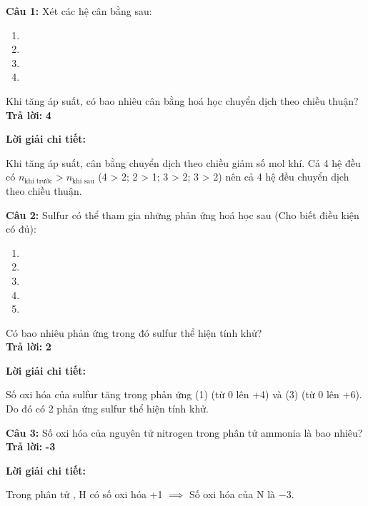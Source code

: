 \documentclass[10.5pt,a4paper]{article}
\newcommand{\loigiai}[1]{%
  \vspace{1pt}
  \begin{tcolorbox}
  {\color{myBlue}\bfseries Lời giải chi tiết:}\par\vspace{1pt}
  {\small #1}
  \end{tcolorbox}
  \vspace{2pt}
}
\begin{document}
\vspace{2pt}
\textbf{Câu 1:} Xét các hệ cân bằng sau:
\begin{enumerate}[label=(\arabic*), itemsep=1pt, topsep=1pt, leftmargin=1.2cm]
    \item {}
    \item {}
    \item {}
    \item {}
\end{enumerate}
Khi tăng áp suất, có bao nhiêu cân bằng hoá học chuyển dịch theo chiều thuận?\\
\textbf{Trả lời:} {\color{myRed}\textbf{4}}
\loigiai{Khi tăng áp suất, cân bằng chuyển dịch theo chiều giảm số mol khí. Cả 4 hệ đều có $n_{\text{khí trước}} > n_{\text{khí sau}}$ (4 > 2; 2 > 1; 3 > 2; 3 > 2) nên cả 4 hệ đều chuyển dịch theo chiều thuận.}

\textbf{Câu 2:} Sulfur có thể tham gia những phản ứng hoá học sau (Cho biết điều kiện có đủ):
\begin{enumerate}[label=(\arabic*), itemsep=1pt, topsep=1pt, leftmargin=1.2cm]
    \item {}
    \item {}
    \item {}
    \item {}
    \item {}
\end{enumerate}
Có bao nhiêu phản ứng trong đó sulfur thể hiện tính khử?\\
\textbf{Trả lời:} {\color{myRed}\textbf{2}}
\loigiai{Số oxi hóa của sulfur tăng trong phản ứng (1) (từ 0 lên +4) và (3) (từ 0 lên +6). Do đó có 2 phản ứng sulfur thể hiện tính khử.}

\textbf{Câu 3:} Số oxi hóa của nguyên tử nitrogen trong phân tử ammonia là bao nhiêu?\\
\textbf{Trả lời:} {\color{myRed}\textbf{-3}}
\loigiai{Trong phân tử , H có số oxi hóa +1 $\implies$ Số oxi hóa của N là $-3$.}
\end{document}
